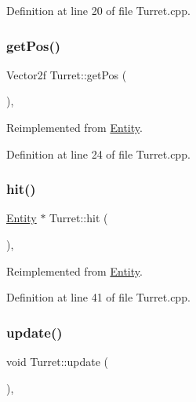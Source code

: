 Definition at line 20 of file Turret.\+cpp.

\mbox{\label{class_turret_a706e5a6001c3a0213b7510d4b99c0768}} 
\subsubsection{\texorpdfstring{get\+Pos()}{getPos()}}
{\footnotesize\ttfamily Vector2f Turret\+::get\+Pos (\begin{DoxyParamCaption}{ }\end{DoxyParamCaption})\hspace{0.3cm}{\ttfamily [override]}, {\ttfamily [virtual]}}



Reimplemented from \hyperlink{class_entity_a8b6080f0ab76702fcd00108aef8ea9dd}{Entity}.



Definition at line 24 of file Turret.\+cpp.

\mbox{\label{class_turret_a141f76a3821b1d08a5aec057506c86e7}} 
\subsubsection{\texorpdfstring{hit()}{hit()}}
{\footnotesize\ttfamily \hyperlink{class_entity}{Entity} $\ast$ Turret\+::hit (\begin{DoxyParamCaption}{ }\end{DoxyParamCaption})\hspace{0.3cm}{\ttfamily [override]}, {\ttfamily [virtual]}}



Reimplemented from \hyperlink{class_entity_a29117f3f40e7069d5d4c1b2fca7819d6}{Entity}.



Definition at line 41 of file Turret.\+cpp.

\mbox{\label{class_turret_aad95afd1118f42d424465c14ebb445c7}} 
\subsubsection{\texorpdfstring{update()}{update()}}
{\footnotesize\ttfamily void Turret\+::update (\begin{DoxyParamCaption}{ }\end{DoxyParamCaption})\hspace{0.3cm}{\ttfamily [override]}, {\ttfamily [virtual]}}



